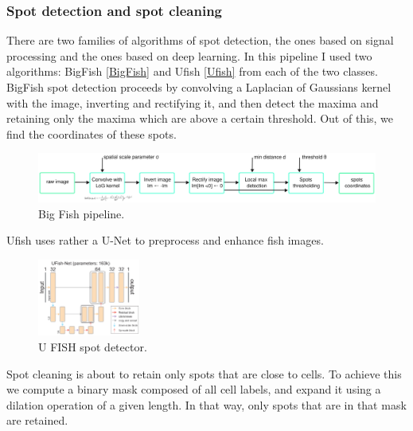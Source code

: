 \documentclass[24pt]{article}
\begin{document}
 
\subsubsection{Spot detection and spot cleaning} 

There are two families of algorithms of spot detection, the ones based on signal processing and the ones based on deep learning. In this
pipeline I used two algorithms: BigFish \href{https://rnajournal.cshlp.org/content/28/6/786.long}{[BigFish]} and Ufish \href{https://www.biorxiv.org/content/10.1101/2024.03.06.583706v1.full.pdf}{[Ufish]}   from each of the two classes.
BigFish spot detection proceeds by convolving a Laplacian of Gaussians kernel with the image, inverting and rectifying it, and then detect the maxima and retaining only the maxima which are above a certain threshold. Out of this, we find the coordinates of these spots. 


 \begin{figure}[h!] %
  \centering
  \includegraphics[width=1\textwidth]{BigFISH_pipeline.png} %
  \caption{Big Fish pipeline.}
  \label{fig:my_image} %
\end{figure}
Ufish uses rather a U-Net to  preprocess and enhance fish images.

 \begin{figure}[h!] %
  \centering
  \includegraphics[width=0.3\textwidth]{ufish.png} %
  \caption{U FISH spot detector.}
  \label{fig:my_image} %
\end{figure}


Spot cleaning is about to retain only spots that are close to cells. To achieve this we compute a binary mask composed of all cell labels, and expand it using a dilation operation of a given length. In that way, only spots that are in that mask are retained. 
\end{document}
